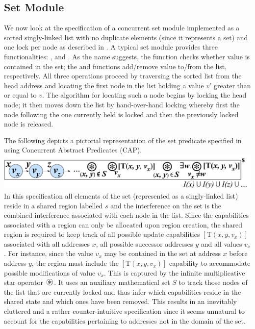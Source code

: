 \subsection{Set Module}
\label{sec:set}
We now look at the specification of a concurrent set module implemented as a sorted singly-linked list with no duplicate elements (since it represents a set) and one lock per node as described in \cite{cap-ecoop10}. A typical set module provides three functionalities: ,  and .
As the name suggests, the  function checks whether value  is contained in the set; the  and  functions add/remove value  to/from the list, respectively.
%
All three operations proceed by traversing the sorted list from the head address and locating the first node in the list holding a value $v'$ greater than or equal to $v$. The algorithm for locating such a node begins by locking the head node; it then moves down the list by hand-over-hand locking whereby first the node following the one currently held is locked and then the previously locked node is released. 
%

The following depicts a pictorial representation of the set predicate specified in ~\cite{cap-ecoop10} using Concurrent Abstract Predicates (CAP).\\
%
\includegraphics[scale=0.24]{Sections/FurtherExamples/Images/capSet.pdf}\\
%
In this specification all elements of the set (represented as a singly-linked list) reside in a shared region labelled $s$ and the interference on the set is the combined interference associated with each node in the list. Since the capabilities associated with a region can only be allocated upon region creation, the shared region is required to keep track of all possible update capabilities $[\text{T}(x, y, v_{x})]$ associated with all addresses $x$, all possible successor addresses $y$ and all values $v_{x}$. For instance, since the value $v_{x}$ may be contained in the set at address $x$ before address $y$, the region must include the $[\text{T}(x, y, v_{x})]$ capability to accommodate possible modifications of value $v_{x}$. This is captured by the infinite multiplicative star operator $\iterStar$. It uses an auxiliary mathematical set $S$ to track those nodes of the list that are currently locked and thus infer which  capabilities reside in the shared state and which ones have been removed. This results in an inevitably cluttered and a rather counter-intuitive specification since it seems unnatural to account for the capabilities pertaining to addresses not in the domain of the set. 

